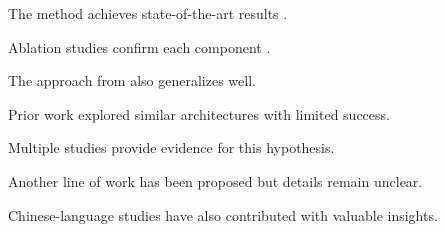 \documentclass{article}
\begin{document}
The method achieves state-of-the-art results \cite{good1}.

Ablation studies confirm each component \cite{good2}.

The approach from \cite{good1} also generalizes well.

Prior work explored similar architectures \cite{supported1} with limited success.

Multiple studies provide evidence \cite{supported1, weak1} for this hypothesis.

Another line of work has been proposed \cite{orphan1} but details remain unclear.

Chinese-language studies have also contributed \cite{cn1} with valuable insights.
\end{document}
